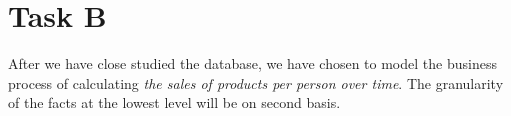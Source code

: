 \section{Task B}
After we have close studied the database, we have chosen to model the business process of calculating \textit{the sales of products per person over time}. 
The granularity of the facts at the lowest level will be on second basis.